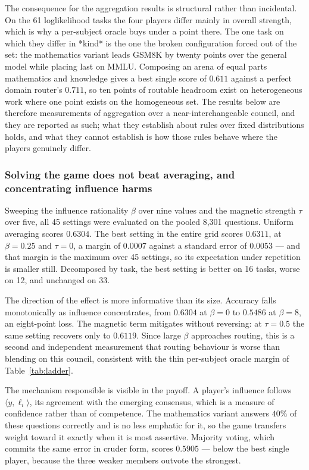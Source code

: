 The consequence for the aggregation results is structural rather than
incidental. On the 61 loglikelihood tasks the four players differ mainly in
overall strength, which is why a per-subject oracle buys under a point there. The
one task on which they differ in *kind* is the one the broken configuration
forced out of the set: the mathematics variant leads GSM8K by twenty points over
the general model while placing last on MMLU. Composing an arena of equal parts
mathematics and knowledge gives a best single score of $0.611$ against a perfect
domain router's $0.711$, so ten points of routable headroom exist on
heterogeneous work where one point exists on the homogeneous set. The results
below are therefore measurements of aggregation over a near-interchangeable
council, and they are reported as such; what they establish about rules over
fixed distributions holds, and what they cannot establish is how those rules
behave where the players genuinely differ.

\subsubsection{Solving the game does not beat averaging, and concentrating influence harms}

Sweeping the influence rationality $\beta$ over nine values and the magnetic
strength $\tau$ over five, all 45 settings were evaluated on the pooled 8{,}301
questions. Uniform averaging scores $0.6304$. The best setting in the entire grid
scores $0.6311$, at $\beta = 0.25$ and $\tau = 0$, a margin of $0.0007$ against a
standard error of $0.0053$ --- and that margin is the maximum over 45 settings,
so its expectation under repetition is smaller still. Decomposed by task, the
best setting is better on 16 tasks, worse on 12, and unchanged on 33.

The direction of the effect is more informative than its size. Accuracy falls
monotonically as influence concentrates, from $0.6304$ at $\beta = 0$ to $0.5486$
at $\beta = 8$, an eight-point loss. The magnetic term mitigates without
reversing: at $\tau = 0.5$ the same setting recovers only to $0.6119$. Since
large $\beta$ approaches routing, this is a second and independent measurement
that routing behaviour is worse than blending on this council, consistent with
the thin per-subject oracle margin of Table~\ref{tab:ladder}.

The mechanism responsible is visible in the payoff. A player's influence follows
$\langle y, \ell_i \rangle$, its agreement with the emerging consensus, which is
a measure of confidence rather than of competence. The mathematics variant
answers $40\%$ of these questions correctly and is no less emphatic for it, so
the game transfers weight toward it exactly when it is most assertive. Majority
voting, which commits the same error in cruder form, scores $0.5905$ --- below the
best single player, because the three weaker members outvote the strongest.

